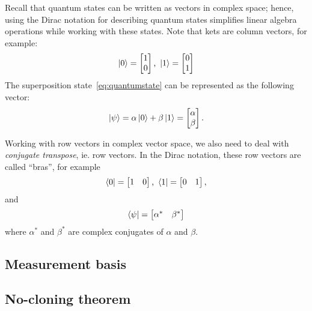 \noindent Recall that quantum states can be written as vectors in complex space; hence, using the Dirac notation for describing quantum states simplifies linear algebra operations while working with these states. Note that kets are column vectors, for example:
\begin{align}
    \ket{0}=\begin{bmatrix} 1\\ 0
\end{bmatrix} \text{, }\ket{1}=\begin{bmatrix} 0\\1
\end{bmatrix}
\end{align}
The superposition state~\eqref{eq:quantumstate} can be represented as the following vector:
\begin{align}
    \ket{\psi}=\alpha\ket{0}+\beta\ket{1} = \begin{bmatrix} \alpha\\ \beta
\end{bmatrix}.
\end{align}

Working with row vectors in complex vector space, we also need to deal with \textit{conjugate transpose}, ie. row vectors. In the Dirac notation, these row vectors are called ``bras'', for example
\begin{align}
    \bra{0}= \begin{bmatrix} 1 & 0 \end{bmatrix} \text{, }\bra{1}=\begin{bmatrix} 0 & 1
\end{bmatrix},
\end{align}
and 
\begin{align}
    \bra{\psi}=  \begin{bmatrix} \alpha^* & \beta^*\end{bmatrix}
\end{align}
where $\alpha^*$ and $\beta^*$ are complex conjugates of $\alpha$ and $\beta$.


\subsection{Measurement basis}

\subsection{No-cloning theorem}